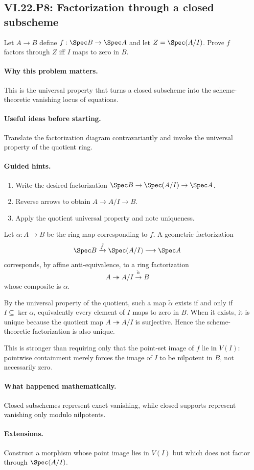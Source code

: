 \subsection*{VI.22.P8: Factorization through a closed subscheme}
\begin{problem}\label{prob:vi22-p08}
Let $A\to B$ define $f:\Spec B\to\Spec A$ and let $Z=\Spec(A/I)$.  Prove $f$ factors through $Z$ iff $I$ maps to zero in $B$.
\end{problem}

\ifdefined\FullProblemDossiers
\paragraph{Why this problem matters.}
This is the universal property that turns a closed subscheme into the scheme-theoretic vanishing locus of equations.

\paragraph{Useful ideas before starting.}
Translate the factorization diagram contravariantly and invoke the universal property of the quotient ring.

\paragraph{Guided hints.}
\begin{enumerate}
\item Write the desired factorization $\Spec B\to\Spec(A/I)\to\Spec A$.
\item Reverse arrows to obtain $A\to A/I\to B$.
\item Apply the quotient universal property and note uniqueness.
\end{enumerate}

\begin{solution}
Let $\alpha:A\to B$ be the ring map corresponding to $f$.  A geometric
factorization
\[
 \Spec B\xrightarrow{\tilde f}\Spec(A/I)\longrightarrow\Spec A
\]
corresponds, by affine anti-equivalence, to a ring factorization
\[
 A\twoheadrightarrow A/I\xrightarrow{\tilde\alpha}B
\]
whose composite is $\alpha$.

By the universal property of the quotient, such a map $\tilde\alpha$ exists if and only if
$I\subseteq\ker\alpha$, equivalently every element of $I$ maps to zero in $B$.  When it exists,
it is unique because the quotient map $A\twoheadrightarrow A/I$ is surjective.  Hence the
scheme-theoretic factorization is also unique.

This is stronger than requiring only that the point-set image of $f$ lie in $V(I)$: pointwise
containment merely forces the image of $I$ to be nilpotent in $B$, not necessarily zero.
\end{solution}

\paragraph{What happened mathematically.}
Closed subschemes represent exact vanishing, while closed supports represent vanishing only modulo nilpotents.

\paragraph{Extensions.}
Construct a morphism whose point image lies in $V(I)$ but which does not factor through $\Spec(A/I)$.
\fi
